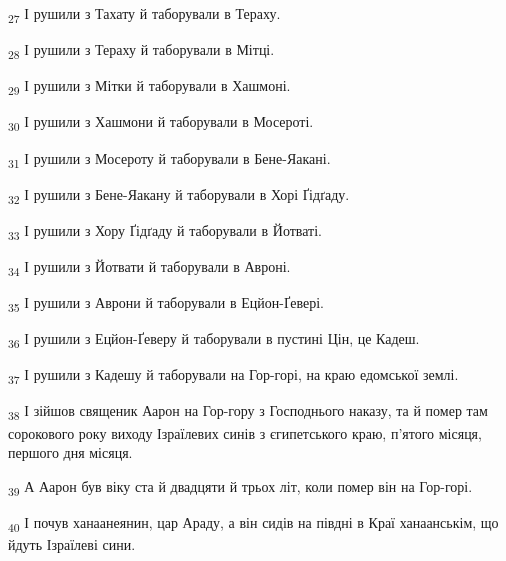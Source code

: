 \begin{tcolorbox}
\textsubscript{27} І рушили з Тахату й таборували в Тераху.
\end{tcolorbox}
\begin{tcolorbox}
\textsubscript{28} І рушили з Тераху й таборували в Мітці.
\end{tcolorbox}
\begin{tcolorbox}
\textsubscript{29} І рушили з Мітки й таборували в Хашмоні.
\end{tcolorbox}
\begin{tcolorbox}
\textsubscript{30} І рушили з Хашмони й таборували в Мосероті.
\end{tcolorbox}
\begin{tcolorbox}
\textsubscript{31} І рушили з Мосероту й таборували в Бене-Яакані.
\end{tcolorbox}
\begin{tcolorbox}
\textsubscript{32} І рушили з Бене-Яакану й таборували в Хорі Ґідґаду.
\end{tcolorbox}
\begin{tcolorbox}
\textsubscript{33} І рушили з Хору Ґідґаду й таборували в Йотваті.
\end{tcolorbox}
\begin{tcolorbox}
\textsubscript{34} І рушили з Йотвати й таборували в Авроні.
\end{tcolorbox}
\begin{tcolorbox}
\textsubscript{35} І рушили з Аврони й таборували в Ецйон-Ґевері.
\end{tcolorbox}
\begin{tcolorbox}
\textsubscript{36} І рушили з Ецйон-Ґеверу й таборували в пустині Цін, це Кадеш.
\end{tcolorbox}
\begin{tcolorbox}
\textsubscript{37} І рушили з Кадешу й таборували на Гор-горі, на краю едомської землі.
\end{tcolorbox}
\begin{tcolorbox}
\textsubscript{38} І зійшов священик Аарон на Гор-гору з Господнього наказу, та й помер там сорокового року виходу Ізраїлевих синів з єгипетського краю, п'ятого місяця, першого дня місяця.
\end{tcolorbox}
\begin{tcolorbox}
\textsubscript{39} А Аарон був віку ста й двадцяти й трьох літ, коли помер він на Гор-горі.
\end{tcolorbox}
\begin{tcolorbox}
\textsubscript{40} І почув ханаанеянин, цар Араду, а він сидів на півдні в Краї ханаанськім, що йдуть Ізраїлеві сини.
\end{tcolorbox}
